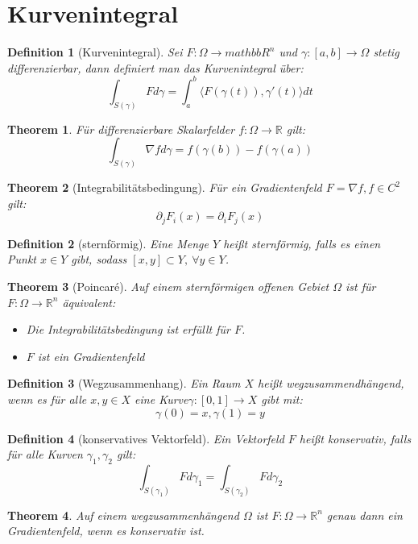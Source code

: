 \documentclass[10pt,a4paper]{article}
\newtheorem{theorem}{Theorem}
\newtheorem{definition}{Definition}
\begin{document}
\section{Kurvenintegral}
\begin{definition}[Kurvenintegral]
	Sei $F: \Omega \to mathbb{R}^n$ und $\gamma: [a, b] \to \Omega$ stetig differenzierbar, dann definiert man das Kurvenintegral über:
	$$\int_{S(\gamma)}Fd\gamma = \int_{a}^{b}\langle F(\gamma(t)), \gamma'(t)\rangle dt$$
\end{definition}
\begin{theorem}
	Für differenzierbare Skalarfelder $f: \Omega \to \mathbb{R}$ gilt:
	$$\int_{S(\gamma)}\nabla f d\gamma = f(\gamma(b))-f(\gamma(a))$$
\end{theorem}
\begin{theorem}[Integrabilitätsbedingung]
	Für ein Gradientenfeld $F=\nabla f, f\in C^2$ gilt:
	$$\partial_jF_i(x) = \partial_iF_j(x)$$
\end{theorem}
\begin{definition}[sternförmig]
	Eine Menge $Y$ heißt sternförmig, falls es einen Punkt $x\in Y$ gibt, sodass $[x, y]\subset Y, \ \forall y\in Y$.
\end{definition}
\begin{theorem}[Poincaré]
	Auf einem sternförmigen offenen Gebiet $\Omega$ ist für $F:\Omega \to \mathbb{R}^n$ äquivalent:
	\begin{itemize}
		\item Die Integrabilitätsbedingung ist erfüllt für $F$.
		\item $F$ ist ein Gradientenfeld
	\end{itemize}
\end{theorem}
\begin{definition}[Wegzusammenhang]
	Ein Raum $X$ heißt wegzusammendhängend, wenn es für alle $x, y\in X$ eine Kurve$\gamma:[0, 1]\to X$ gibt mit:
	$$\gamma(0)=x, \gamma(1)=y$$
\end{definition}
\begin{definition}[konservatives Vektorfeld]
	Ein Vektorfeld $F$ heißt konservativ, falls für alle Kurven $\gamma_1, \gamma_2$ gilt:
	$$\int_{S(\gamma_1)}Fd\gamma_1 = \int_{S(\gamma_2)}Fd\gamma_2$$
\end{definition}
\begin{theorem}
	Auf einem wegzusammenhängend $\Omega$ ist $F: \Omega \to \mathbb{R}^n$ genau dann ein Gradientenfeld, wenn es konservativ ist.
\end{theorem}
\end{document}
